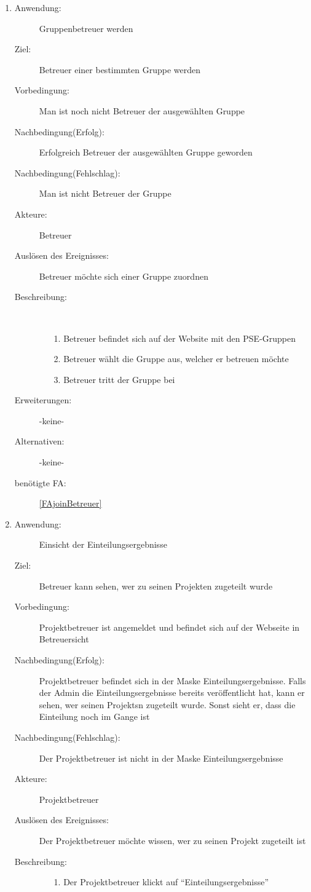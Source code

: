 \documentclass[parskip=full]{scrartcl}
\newcommand{\swtLabel}[1]{\textbf{/#1\arabic*0/}}
\begin{document}
\begin{enumerate} [label=\swtLabel{B}]
 
  \item
	\begin{description}
  		\item[Anwendung:] Gruppenbetreuer werden
  		\item[Ziel:] Betreuer einer bestimmten Gruppe werden
  		\item[Vorbedingung:] Man ist noch nicht Betreuer der ausgewählten Gruppe
  		\item[Nachbedingung(Erfolg):] Erfolgreich Betreuer der ausgewählten
  		Gruppe geworden
  		\item[Nachbedingung(Fehlschlag):] Man ist nicht Betreuer der Gruppe
  		\item[Akteure:] Betreuer
  		\item[Auslösen des Ereignisses:] Betreuer möchte sich einer Gruppe
  		zuordnen
  		\item[Beschreibung:]~
  	\begin{enumerate} 
  	  \item[1.] Betreuer befindet sich auf der Website mit den \gls{PSE}-Gruppen
  	  \item[2.] Betreuer wählt die Gruppe aus, welcher er betreuen möchte
  	  \item[3.] Betreuer tritt der Gruppe bei
  	\end{enumerate}
  	\item[Erweiterungen:] -keine-
  	\item[Alternativen:] -keine-
  	\item[benötigte FA:] \ref{FAjoinBetreuer}
  \end{description}
  
  
  \item
  \begin{description}
  	\item[Anwendung:] Einsicht der Einteilungsergebnisse
  	\item[Ziel:] Betreuer kann sehen, wer zu seinen Projekten zugeteilt wurde
  	\item[Vorbedingung:] \gls{Projektbetreuer} ist angemeldet und befindet sich auf der
  	Webseite in Betreuersicht  %
  	\item[Nachbedingung(Erfolg):] \gls{Projektbetreuer} befindet sich in der Maske
  	Einteilungsergebnisse. %
  	Falls der Admin die Einteilungsergebnisse bereits veröffentlicht hat, kann er
  	sehen, wer seinen \glspl{Projekt}n zugeteilt wurde. Sonst sieht er, dass die Einteilung
  	noch im Gange ist
  	\item[Nachbedingung(Fehlschlag):] Der \gls{Projektbetreuer} ist nicht in der
  	Maske Einteilungsergebnisse
  	\item[Akteure:] \gls{Projektbetreuer}
  	\item[Auslösen des Ereignisses:] Der \gls{Projektbetreuer} möchte wissen, wer zu seinen Projekt zugeteilt ist
  	\item[Beschreibung:]
  	\begin{enumerate}~
  		\item[1.] Der \gls{Projektbetreuer} klickt auf \enquote{Einteilungsergebnisse}
  		

\end{enumerate}
\end{description}
\end{enumerate}
\end{document}

